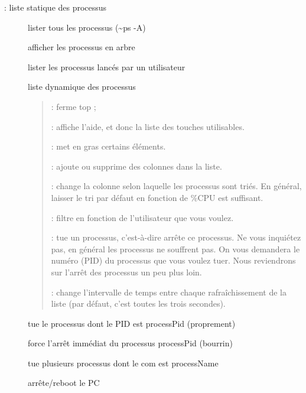 \documentclass[letterpaper,10pt,french]{sphinxmanual}
\begin{document}
 : liste statique des processus
\begin{description}
\item[{}] \leavevmode
lister tous les processus (\textasciitilde{}ps -A)

\item[{}] \leavevmode
afficher les processus en arbre

\item[{}] \leavevmode
lister les processus lancés par un utilisateur

\item[{}] \leavevmode
liste dynamique des processus
\begin{quote}

 : ferme top ;

 : affiche l’aide, et donc la liste des touches utilisables.

 : met en gras certains éléments.

 : ajoute ou supprime des colonnes dans la liste.

 : change la colonne selon laquelle les processus sont triés. En général, laisser le tri par défaut en fonction de \%CPU est suffisant.

 : filtre en fonction de l’utilisateur que vous voulez.

 : tue un processus, c’est-à-dire arrête ce processus. Ne vous inquiétez pas, en général les processus ne souffrent pas. On vous demandera le numéro (PID) du processus que vous voulez tuer. Nous reviendrons sur l’arrêt des processus un peu plus loin.

 : change l’intervalle de temps entre chaque rafraîchissement de la liste (par défaut, c’est toutes les trois secondes).
\end{quote}

\item[{}] \leavevmode
tue le processus dont le PID est processPid (proprement)

\item[{}] \leavevmode
force l’arrêt immédiat du processus processPid (bourrin)

\item[{}] \leavevmode
tue plusieurs processus dont le com est processName

\item[{}] \leavevmode
arrête/reboot le PC

\end{description}
\end{document}
